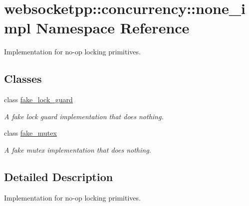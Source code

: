 \hypertarget{namespacewebsocketpp_1_1concurrency_1_1none__impl}{}\section{websocketpp\+:\+:concurrency\+:\+:none\+\_\+impl Namespace Reference}
\label{namespacewebsocketpp_1_1concurrency_1_1none__impl}


Implementation for no-\/op locking primitives.  


\subsection*{Classes}
\begin{DoxyCompactItemize}
\item 
class \hyperlink{classwebsocketpp_1_1concurrency_1_1none__impl_1_1fake__lock__guard}{fake\+\_\+lock\+\_\+guard}
\begin{DoxyCompactList}\small\item\em A fake lock guard implementation that does nothing. \end{DoxyCompactList}\item 
class \hyperlink{classwebsocketpp_1_1concurrency_1_1none__impl_1_1fake__mutex}{fake\+\_\+mutex}
\begin{DoxyCompactList}\small\item\em A fake mutex implementation that does nothing. \end{DoxyCompactList}\end{DoxyCompactItemize}


\subsection{Detailed Description}
Implementation for no-\/op locking primitives. 